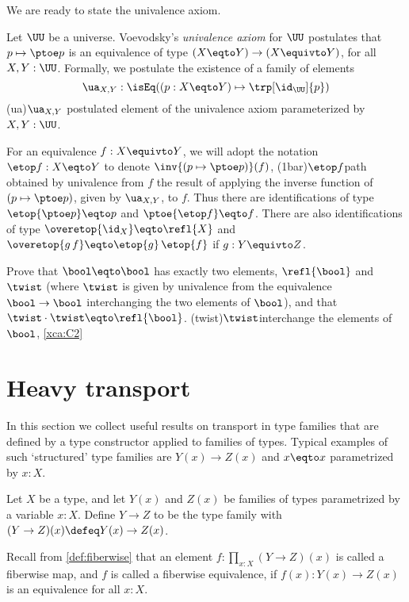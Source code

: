 We are ready to state the univalence axiom.

\begin{principle}\label{def:univalence}
    Let $\UU$ be a universe.
    Voevodsky's \emph{univalence axiom} for $\UU$
    postulates that $p\mapsto \ptoe p$ is an equivalence 
    of type $(X \eqto Y) \to (X\equivto Y)$, for all $X,Y:\UU$.
    Formally, we postulate the existence of a family of elements
    \[
      \ua_{X,Y} : \isEq((p:X\eqto Y)\mapsto \trp[\id_\UU]{p})
    \]
    \glossary(ua){$\protect\ua_{X,Y}$}%
    {postulated element of the univalence axiom}%
    parameterized by $X,Y:\UU$.
\end{principle}

For an equivalence $f: X\equivto Y$, we will adopt the 
notation $\etop f : X \eqto Y $ to denote $\inv{(p\mapsto\ptoe p)}(f)$,%
\glossary(1bar){$\protect\etop f$}{path obtained by univalence from $f$}
the result of applying the inverse function of $(p\mapsto\ptoe p)$, 
given by $\ua_{X,Y}$, to $f$.  
Thus there are identifications of type $\etop {\ptoe p} \eqto p$ 
and $\ptoe {\etop f} \eqto f$.  There are also identifications of 
type $\overetop{\id_X} \eqto \refl{X}$
and $\overetop{g\,f} \eqto \etop{g}\,\etop{f}$ if $g: Y\equivto Z$.

\begin{xca}\label{xca:C2}
Prove that $\bool \eqto \bool$ has exactly two elements,
$\refl{\bool}$ and $\twist$ (where $\twist$ is given by
univalence from the equivalence $\bool\to\bool$ interchanging
the two elements of $\bool$), and that $\twist\cdot\twist \eqto \refl{\bool}$.%
\glossary(twist){$\protect\twist$}{interchange the elements of $\bool$,
  \cref{xca:C2}}
\end{xca}


\section{Heavy transport}
\label{sec:heavy-transport}

In this section we collect useful results on transport in
type families that are defined by a type constructor applied
to families of types.
Typical examples of such `structured' type families are
$Y(x)\to Z(x)$ and $x \eqto x$ parametrized by $x:X$.

\begin{definition}\label{def:function-type-families}
Let $X$ be a type, and let $Y(x)$ and $Z(x)$ be families of types parametrized by a variable $x:X$.
Define $Y\to Z$ to be the type family
with $(Y\to Z)(x) \defeq Y(x)\to Z(x)$.
\end{definition}
Recall from \cref{def:fiberwise} that an element $f : \prod_{x:X}(Y\to Z)(x)$
is called a fiberwise map,
and $f$ is called a fiberwise equivalence,
if $f(x): Y(x)\to Z(x)$ is an equivalence for all $x:X$.

